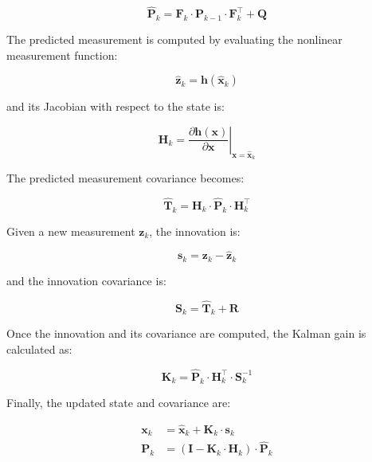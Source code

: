 \begin{equation}
  \hat{\mathbf{P}}_k = \mathbf{F}_k \cdot \mathbf{P}_{k-1} \cdot \mathbf{F}_k^\top + \mathbf{Q}
\end{equation}

The predicted measurement is computed by evaluating the nonlinear measurement function:

\begin{equation}
  \hat{\mathbf{z}}_k = \mathbf{h}(\hat{\mathbf{x}}_k)
\end{equation}

and its Jacobian with respect to the state is:

\begin{equation}
  \mathbf{H}_k = \left. \frac{\partial \mathbf{h}(\mathbf{x})}{\partial \mathbf{x}} \right|_{\mathbf{x} = \hat{\mathbf{x}}_k}
\end{equation}

The predicted measurement covariance becomes:

\begin{equation}
  \hat{\mathbf{T}}_k = \mathbf{H}_k \cdot \hat{\mathbf{P}}_k \cdot \mathbf{H}_k^\top
\end{equation}

Given a new measurement $\mathbf{z}_k$, the innovation is:

\begin{equation}
  \mathbf{s}_k = \mathbf{z}_k - \hat{\mathbf{z}}_k
\end{equation}

and the innovation covariance is:

\begin{equation}
  \mathbf{S}_k = \hat{\mathbf{T}}_k + \mathbf{R}
\end{equation}

Once the innovation and its covariance are computed, the Kalman gain is calculated as:

\begin{equation}
  \mathbf{K}_k = \hat{\mathbf{P}}_k \cdot \mathbf{H}_k^\top \cdot \mathbf{S}_k^{-1}
\end{equation}

Finally, the updated state and covariance are:

\begin{align}
  \mathbf{x}_k &= \hat{\mathbf{x}}_k + \mathbf{K}_k \cdot \mathbf{s}_k \\
  \mathbf{P}_k &= \left( \mathbf{I} - \mathbf{K}_k \cdot \mathbf{H}_k \right) \cdot \hat{\mathbf{P}}_k
\end{align}

